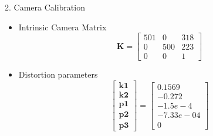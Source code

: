 \documentclass[10pt]{beamer}
\begin{document}
\begin{frame}{}
    \begin{description}
        \item[2. Camera Calibration]
    \end{description}{}
        \begin{minipage}{0.47\textwidth}
\begin{itemize}
    \item Intrinsic Camera Matrix \\
    
    $$\mathbf{K} = \begin{bmatrix}
        501 & 0 & 318\\
        0  & 500 & 223 \\
        0 & 0 & 1
    \end{bmatrix}$$
    \item Distortion parameters 
    $$\begin{bmatrix}
        \mathbf{k1}\\
        \mathbf{k2}\\
        \mathbf{p1}\\
        \mathbf{p2}\\
        \mathbf{p3}
    \end{bmatrix} =  \begin{bmatrix}
        0.1569\\
        -0.272\\
        -1.5e-4\\
        -7.33e-04\\
        0
    \end{bmatrix}$$


\end{itemize}
\end{minipage}
\end{frame}
\end{document}
